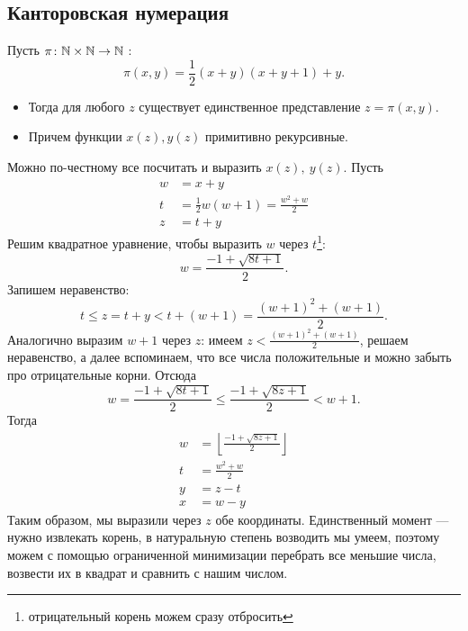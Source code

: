 \subsection{Канторовская нумерация}
\begin{thm}
    Пусть $ \pi\colon \mathbb{N} \times \mathbb{N} \to  \mathbb{N}$ :
	\[
		\pi(x, y) = \frac{1}{2}(x+y) (x+y+1)+y
	.\] 
	\begin{itemize}
	\item
	Тогда для любого $ z$ существует единственное представление $ z = \pi(x, y)$.
\item Причем функции $ x(z), y(z)$ примитивно рекурсивные.
	\end{itemize}
\end{thm}
\begin{proof*}
 Можно по-честному все посчитать и выразить $ x(z), ~y(z)$.
	Пусть 
	\[
	\begin{aligned}
		w &= x+y \\
		t &= \frac{1}{2}w(w+1) = \frac{w^2+w}{2} \\
		z &= t +y
	\end{aligned}
	\]
	Решим квадратное уравнение, чтобы выразить $ w$ через $ t$\footnote{отрицательный корень можем сразу отбросить}:
	\[
		w = \frac{-1 + \sqrt{ 8t + 1}}{2}
	.\] 
	Запишем неравенство:
	\[
		t \le z = t + y < t + (w +1) = \frac{(w+1)^2+(w+1)}{2}
	.\] 
	Аналогично выразим $ w+1$ через $ z$: имеем $ z < \frac{(w+1)^2+(w+1)}{2}$, решаем неравенство, а далее вспоминаем, что все числа положительные и можно забыть про отрицательные корни.
	Отсюда
	\[
		w = \frac{-1 + \sqrt{ 8t + 1}}{2} \le \frac{-1  + \sqrt{ 8z +1} }{2} < w+1
	.\] 
	Тогда 
	\[
	\begin{aligned}
		w &= \left\lfloor \frac{-1 + \sqrt{ 8z+1} }{2} \right\rfloor \\
		t &= \frac{w^2+w}{2} \\
		y &= z - t \\
		x &= w - y
	\end{aligned}
	\]
	Таким образом, мы выразили через $ z$ обе координаты. Единственный момент --- нужно извлекать корень, в натуральную степень возводить мы умеем, поэтому можем с помощью ограниченной минимизации перебрать все меньшие числа, возвести их в квадрат и сравнить с нашим числом.
\end{proof*}

